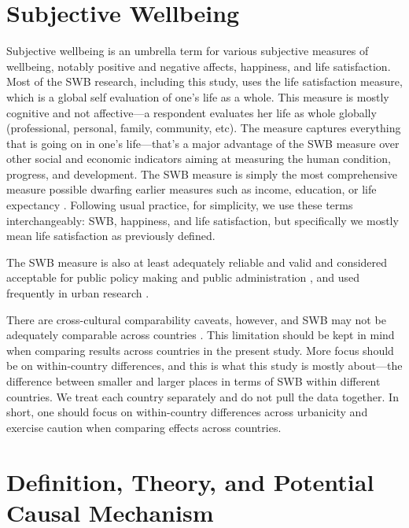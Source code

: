 \documentclass[10pt, letterpaper]{article}
\begin{document}
   
\section*{Subjective Wellbeing}

Subjective wellbeing is an umbrella term for various subjective measures
of wellbeing, notably positive and negative affects, happiness, and life
satisfaction. Most of the SWB research, including this study, uses the life satisfaction measure, which is a global self evaluation of one's life as a whole. This measure is mostly cognitive and not affective---a respondent evaluates her life as whole globally (professional, personal, family, community, etc). The measure captures everything that is going on in one's life---that's a major advantage of the SWB measure over other social and economic indicators aiming at measuring the human condition, progress, and development. The SWB measure is simply the most comprehensive measure possible dwarfing earlier measures such as income, education, or life expectancy  \citep[for a review see][]{diener09}.
Following usual practice, for simplicity, we use these terms interchangeably: SWB, happiness, and life satisfaction, but specifically we mostly mean life satisfaction as previously defined.

The SWB measure is also at least adequately reliable and valid and considered
acceptable for public policy making and public administration
\citep{diener09,stiglitz09al}, and used frequently in urban research \citep[e.g.,][]{moeinaddini20,mouratidis19,wang19,anon17-cities-oslo,ma17,wkeziak16,valente16,chen15}.

There are cross-cultural comparability caveats, however, and SWB may not be
adequately comparable across countries \citep{kahneman99,diener09}. This limitation should be kept in mind when comparing results across countries in the present study. More focus should be on within-country differences, and this is what this study is mostly about---the difference between smaller and larger places in terms of SWB
within different countries. We treat each country separately and do not pull the data together. In short, one should focus on within-country differences across urbanicity and exercise caution when comparing effects across countries. 

\section*{Definition, Theory, and Potential Causal Mechanism}
\end{document}

